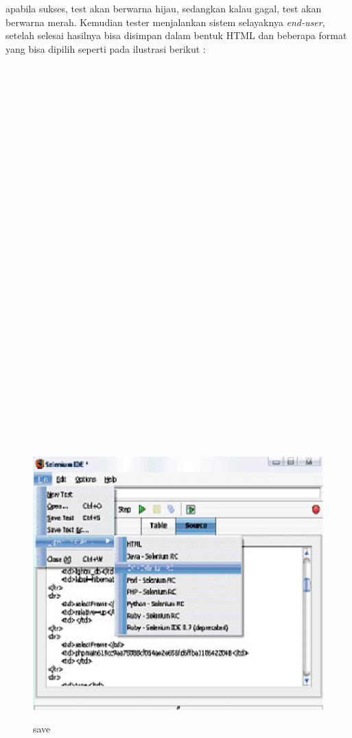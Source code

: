 \documentclass[9pt,twocolumn,twoside]{Gunadarma}
\begin{document}
apabila sukses, test akan berwarna hijau, sedangkan kalau gagal, test akan berwarna merah. Kemudian tester menjalankan sistem selayaknya \textit{end-user}, setelah selesai hasilnya bisa disimpan dalam bentuk HTML dan beberapa format yang bisa dipilih seperti pada ilustrasi berikut :
\\ \\ \\ \\ \\ \\ \\ \\ \\ \\ \\ \\ \\ \\ \\ \\ \\ \\
\\ \\ \\ \\ \\ \\ \\ \\ \\ \\ \\ \\ 

\begin{figure}[htbp]
	\begin{center}
		\includegraphics[width=1\columnwidth]{save.eps} \label{fig:1-noFCase1}
	\end{center}
	\caption{save}
\end{figure}
\end{document}
